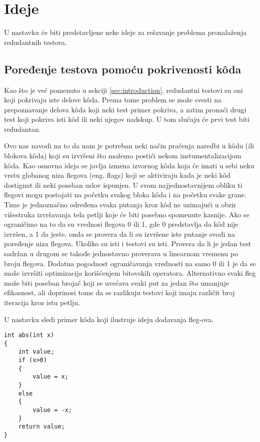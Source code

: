 \documentclass[a4paper]{article}
\begin{document}
\section{Ideje}
\label{sec:ideas}
U nastavku će biti predstavljene neke ideje za rešavanje problema pronalaženja redudantnih testova.

\subsection{Poređenje testova pomoću pokrivenosti kôda}
\label{sec:idea1}
Kao što je već pomenuto u sekciji \ref{sec:introduction}, redudantni testovi su oni koji pokrivaju iste delove kôda. Prema tome problem se može svesti na prepoznavanje delova kôda koji neki test primer pokriva, a zatim pronaći drugi test koji pokriva isti kôd ili neki njegov nadskup. U tom slučaju će prvi test biti redudantan. 

Ovo nas navodi na to da nam je potreban neki način praćenja naredbi u kôdu (ili blokova kôda) koji su izvršeni što možemo postići nekom instumentalizacijom kôda. Kao osnovna ideja se javlja izmena izvornog kôda koja će imati u sebi neku vrstu globanog niza flegova (eng. flags) koji se aktiviraju kada je neki kôd dostignut ili neki poseban uslov ispunjen. U svom najjednostavnijem obliku ti flegovi mogu postojati na početku svakog bloka kôda i na početku svake grane. Time je jednoznačno određena svaka putanja kroz kôd ne uzimajući u obzir višestruka izvršavanja tela petlji koje će biti posebno spomenute kasnije. Ako se ograničimo na to da su vrednosi flegova 0 ili 1, gde 0 predstavlja da kôd nije izvršen, a 1 da jeste, onda se provera da li su izvršene iste putanje svodi na poređenje niza flegova. Ukoliko su isti i testovi su isti. Provera da li je jedan test sadržan u drugom se takođe jednostavno proverava u linearnom vremenu po broju flegova. Dodatna pogodnost ograničavanja vrednosti na samo 0 ili 1 je da se može izvršiti optimizacija korišćenjem bitovskih operatora. Alternativno svaki fleg može biti poseban brojač koji se uvećava svaki put za jedan što umanjuje efikasnost, ali doprinosi tome da se razlikuju testovi koji imaju različit broj iteracija kroz istu petlju. 

U nastavku sledi primer kôda koji ilustruje ideju dodavanja fleg-ova.

\newpage

\begin{lstlisting}
int abs(int x)
{
	int value;
	if (x>0)
	{
		value = x;
	}
	else
	{
		value = -x;
	}
	return value;
}
\end{lstlisting}
\end{document}
